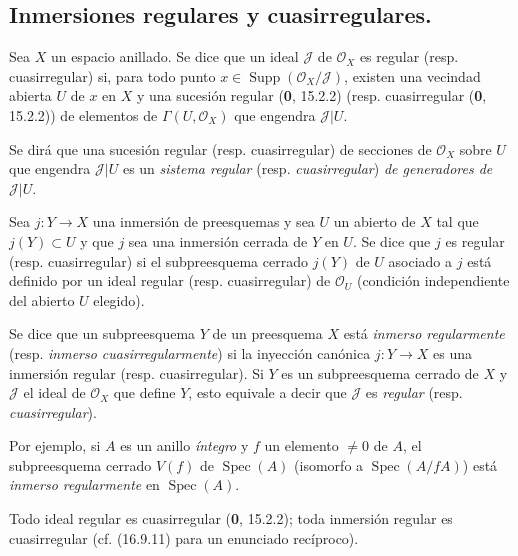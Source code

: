 \subsection{Inmersiones regulares y cuasirregulares.}
\label{IV.16.9}

\begin{definition}[16.9.1]
\label{IV.16.9.1}
Sea $X$ un espacio anillado. Se dice que un ideal $\mathscr{J}$ de
$\mathcal{O}_X$ es regular \textup{(resp.} cuasirregular\textup{)} si, para todo
punto $x\in\operatorname{Supp}(\mathcal{O}_X/\mathscr{J})$, existen una
vecindad abierta $U$ de $x$ en $X$ y una sucesión regular \textup{(\textbf 0, 15.2.2) (resp.}
cuasirregular \textup{(\textbf 0, 15.2.2))} de elementos de $\Gamma(U,\mathcal{O}_X)$ que
engendra $\mathscr{J}|U$.
\end{definition}

Se dirá que una sucesión regular (resp. cuasirregular) de secciones de
$\mathcal{O}_X$ sobre $U$ que engendra $\mathscr{J}|U$ es un
\emph{sistema regular} (resp. \emph{cuasirregular}) \emph{de generadores
de} $\mathscr{J}|U$.

\begin{definition}[16.9.2]
\label{IV.16.9.2}
Sea $j:Y\to X$ una inmersión de preesquemas y sea $U$ un abierto de $X$ tal
que $j(Y)\subset U$ y que $j$ sea una inmersión cerrada de $Y$ en $U$. Se
dice que $j$ es regular \textup{(resp.} cuasirregular\textup{)} si el
subpreesquema cerrado $j(Y)$ de $U$ asociado a $j$ está definido por un ideal
regular \textup{(resp.} cuasirregular\textup{)} de $\mathcal{O}_U$ \textup{(condición independiente del
abierto $U$ elegido)}.
\end{definition}

Se dice que un subpreesquema $Y$ de un preesquema $X$ está \emph{inmerso
regularmente} (resp. \emph{inmerso cuasirregularmente}) si la inyección
canónica $j:Y\to X$ es una inmersión regular (resp. cuasirregular). Si $Y$ es
un subpreesquema cerrado de $X$ y $\mathscr{J}$ el ideal de $\mathcal{O}_X$
que define $Y$, esto equivale a decir que $\mathscr{J}$ es \emph{regular}
(resp. \emph{cuasirregular}).

Por ejemplo, si $A$ es un anillo \emph{íntegro} y $f$ un elemento $\neq0$ de
$A$, el subpreesquema cerrado $V(f)$ de $\operatorname{Spec}(A)$ (isomorfo a
$\operatorname{Spec}(A/fA)$) está \emph{inmerso regularmente} en
$\operatorname{Spec}(A)$.

Todo ideal regular es cuasirregular (\textbf 0, 15.2.2); toda inmersión regular es
cuasirregular (cf. (16.9.11) para un enunciado recíproco).

